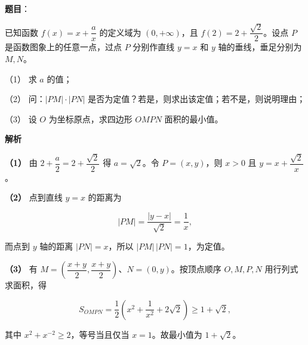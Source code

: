 \begin{answer}

\textbf{题目}：

已知函数 $f(x)=x+\dfrac ax$ 的定义域为 $(0,+\infty)$，且 $f(2)=2+\dfrac{\sqrt2}{2}$。设点 $P$ 是函数图象上的任意一点，过点 $P$ 分别作直线 $y=x$ 和 $y$ 轴的垂线，垂足分别为 $M,N$。

（1） 求 $a$ 的值；

（2） 问：$\lvert PM\rvert\cdot\lvert PN\rvert$ 是否为定值？若是，则求出该定值；若不是，则说明理由；

（3） 设 $O$ 为坐标原点，求四边形 $OMPN$ 面积的最小值。
\nopagebreak[4]
\begin{center}\end{center}
\nopagebreak[4]
\textbf{解析}

\textbf{（1）} 由 $2+\dfrac a2=2+\dfrac{\sqrt2}{2}$ 得 $a=\sqrt2$。令 $P=(x,y)$，则 $x>0$ 且 $y=x+\dfrac{\sqrt2}{x}$。

\textbf{（2）} 点到直线 $y=x$ 的距离为

\nopagebreak[4]
\[
|PM|=\frac{|y-x|}{\sqrt2}=\frac1x,
\]

而点到 $y$ 轴的距离 $|PN|=x$，所以 $|PM|\,|PN|=1$，为定值。

\textbf{（3）} 有 $M=\left(\dfrac{x+y}{2},\dfrac{x+y}{2}\right)$、$N=(0,y)$。按顶点顺序 $O,M,P,N$ 用行列式求面积，得

\nopagebreak[4]
\[
S_{OMPN}=\frac12\left(x^2+\frac1{x^2}+2\sqrt2\right)
\ge1+\sqrt2,
\]

其中 $x^2+x^{-2}\ge2$，等号当且仅当 $x=1$。故最小值为 $1+\sqrt2$。




\end{answer}
